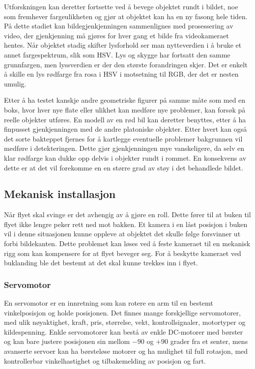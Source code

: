 Utforskningen kan deretter fortsette ved å bevege objektet rundt i bildet, noe som fremhever fargeulikheten og gjør at objektet kan ha en ny fasong hele tiden. På dette stadiet kan bildegjenkjenningen sammenlignes med prosessering av video, der gjenkjenning må gjøres for hver gang et bilde fra videokameraet hentes. Når objektet stadig skifter lysforhold ser man nytteverdien i å bruke et annet fargespektrum, slik som HSV. Lys og skygge har fortsatt den samme grunnfargen, men lyssverdien er der den største forandringen skjer. Det er enkelt å skille en lys rødfarge fra rosa i HSV i motsetning til RGB, der det er nesten umulig. 

Etter å ha testet kanskje andre geometriske figurer på samme måte som med en boks, hvor hver nye flate eller ulikhet kan medføre nye problemer, kan forsøk på reelle objekter utføres. En modell av en rød bil kan deretter benyttes, etter å ha finpusset gjenkjenningen med de andre platoniske objekter. Etter hvert kan også det sorte bakteppet fjernes for å kartlegge eventuelle problemer bakgrunnen vil medføre i detekteringen. Dette gjør gjenkjenningen mye vanskeligere, da selv en klar rødfarge kan dukke opp delvis i objekter rundt i rommet. En konsekvens av dette er at det vil forekomme en en større grad av støy i det behandlede bildet.  

\subsection{Mekanisk installasjon}
Når flyet skal svinge er det avhengig av å gjøre en roll. Dette fører til at buken til flyet ikke lengre peker rett ned mot bakken. Et kamera i en låst posisjon i buken vil i denne situasjonen kunne oppleve at objektet det skulle følge forsvinner ut forbi bildekanten. Dette problemet kan løses ved å feste kameraet til en mekanisk rigg som kan kompensere for at flyet beveger seg. For å beskytte kameraet ved buklanding ble det bestemt at det skal kunne trekkes inn i flyet.


\subsubsection{Servomotor}

En servomotor er en innretning som kan rotere en arm til en bestemt vinkelposisjon og holde posisjonen. Det finnes mange forskjellige servomotorer, med ulik nøyaktighet, kraft, pris, størrelse, vekt, kontrollsignaler, motortyper og kildespenning. Enkle servomotorer kan bestå av enkle DC-motorer med børster og kan bare justere posisjonen sin mellom $-90$ og $+90$ grader fra et senter, mens avanserte servoer kan ha børsteløse motorer og ha mulighet til full rotasjon, med kontrollerbar vinkelhastighet og tilbakemelding av posisjon og fart.

